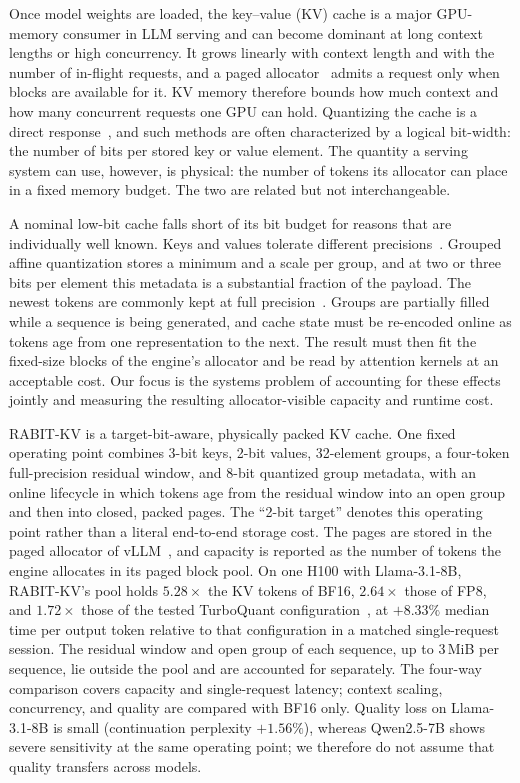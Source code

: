 \documentclass{article}
\begin{document}
Once model weights are loaded, the key--value (KV) cache is a major GPU-memory consumer in LLM serving
and can become dominant at long context lengths or high concurrency. It grows linearly with context length and with the number of in-flight requests, and a
paged allocator~\citep{kwon2023vllm} admits a request only when blocks are available for it. KV memory therefore
bounds how much context and how many concurrent requests one GPU can hold. Quantizing the cache is a
direct response~\citep{liu2024kivi,hooper2024kvquant,zandieh2025turboquant}, and such methods are often
characterized by a logical bit-width: the number of bits per stored key or value element. The quantity a serving system can use,
however, is physical: the number of tokens its allocator can place in a fixed memory budget. The two
are related but not interchangeable.

A nominal low-bit cache falls short of its bit budget for reasons that are individually well known.
Keys and values tolerate different precisions~\citep{liu2024kivi,tao2024asymkv}. Grouped affine quantization stores a minimum and a scale
per group, and at two or three bits per element this metadata is a substantial fraction of the payload.
The newest tokens are commonly kept at full precision~\citep{liu2024kivi,duanmu2024skvq}. Groups are partially filled while a sequence is
being generated, and cache state must be re-encoded online as tokens age from one representation to the
next. The result must then fit the fixed-size blocks of the engine's allocator and be read by attention
kernels at an acceptable cost. Our focus is the systems problem of accounting for these effects jointly
and measuring the resulting allocator-visible capacity and runtime cost.

RABIT-KV is a target-bit-aware, physically packed KV cache. One fixed operating point combines 3-bit
keys, 2-bit values, 32-element groups, a four-token full-precision residual window, and 8-bit quantized
group metadata, with an online lifecycle in which tokens age from the residual window into an open
group and then into closed, packed pages. The ``2-bit target'' denotes this operating point rather than
a literal end-to-end storage cost. The pages are stored in the paged allocator of vLLM~\citep{kwon2023vllm}, and
capacity is reported as the number of tokens the engine allocates in its paged block pool. On one H100
with Llama-3.1-8B, RABIT-KV's pool holds $5.28\times$ the KV tokens of BF16, $2.64\times$ those of FP8,
and $1.72\times$ those of the tested TurboQuant configuration~\citep{zandieh2025turboquant,vllm2026turboquant}, at $+8.33\%$ median time per output token
relative to that configuration in a matched single-request session. The residual window and open group
of each sequence, up to 3\,MiB per sequence, lie outside the pool and are accounted for separately. The
four-way comparison covers capacity and single-request latency; context scaling, concurrency, and
quality are compared with BF16 only. Quality loss on Llama-3.1-8B is
small (continuation perplexity $+1.56\%$), whereas Qwen2.5-7B shows severe sensitivity at the same
operating point; we therefore do not assume that quality transfers across models.
\end{document}
